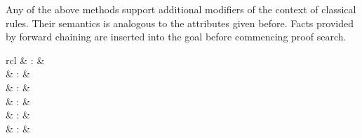 \begin{isabellebody}
\begin{isamarkuptext}
  Any of the above methods support additional modifiers of the context
  of classical rules.  Their semantics is analogous to the attributes
  given before.  Facts provided by forward chaining are inserted into
  the goal before commencing proof search.%
\end{isamarkuptext}%
\isamarkuptrue%
%
\isamarkuptrue%
%
\begin{isamarkuptext}%
\begin{matharray}{rcl}
    \hypertarget{method.auto}{\hyperlink{method.auto}{\mbox{}}} & : &  \\
    \hypertarget{method.force}{\hyperlink{method.force}{\mbox{}}} & : &  \\
    \hypertarget{method.clarsimp}{\hyperlink{method.clarsimp}{\mbox{}}} & : &  \\
    \hypertarget{method.fastsimp}{\hyperlink{method.fastsimp}{\mbox{}}} & : &  \\
    \hypertarget{method.slowsimp}{\hyperlink{method.slowsimp}{\mbox{}}} & : &  \\
    \hypertarget{method.bestsimp}{\hyperlink{method.bestsimp}{\mbox{}}} & : &  \\
  \end{matharray}


\end{isamarkuptext}
\end{isabellebody}
